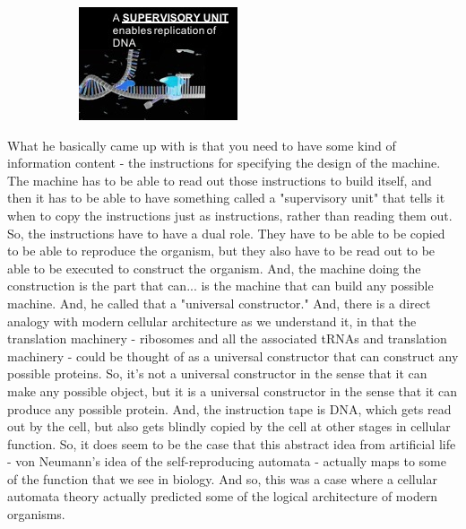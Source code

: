 \documentclass[]{article}
\begin{document}
\begin{figure}[H]
\begin{subfigure}[b]{0.45\textwidth}
		\includegraphics[width=\textwidth]{VonNeumann2}
	\end{subfigure}
\end{figure}

What he basically came up with is that
you need to have some kind
of information content -
the instructions for specifying
the design of the machine.
The machine has to be able to read out
those instructions to build itself,
and then it has to be able to have
something called a "supervisory unit"
that tells it when to copy
the instructions
just as instructions,
rather than reading them out.
So, the instructions have to
have a dual role.
They have to be able to be copied
to be able to reproduce the organism,
but they also have to be read out
to be able to be executed
to construct the organism.
And, the machine doing the construction
is the part that can...
is the machine that can build
any possible machine.
And, he called that
a "universal constructor."
And, there is a direct analogy
with modern cellular architecture
as we understand it,
in that the translation machinery -
ribosomes and all the associated
tRNAs and translation machinery -
could be thought of
as a universal constructor
that can construct any possible proteins.
So, it's not a universal constructor
in the sense that it can make
any possible object,
but it is a universal constructor
in the sense
that it can produce any possible protein.
And, the instruction tape is DNA,
which gets read out by the cell,
but also gets blindly copied
by the cell at other stages
in cellular function.
So, it does seem to be the case
that this abstract idea
from artificial life -
von Neumann's idea of
the self-reproducing automata -
actually maps to some of the function
that we see in biology.
And so, this was a case where
a cellular automata theory
actually predicted some of the logical
architecture of modern organisms.
\end{document}
